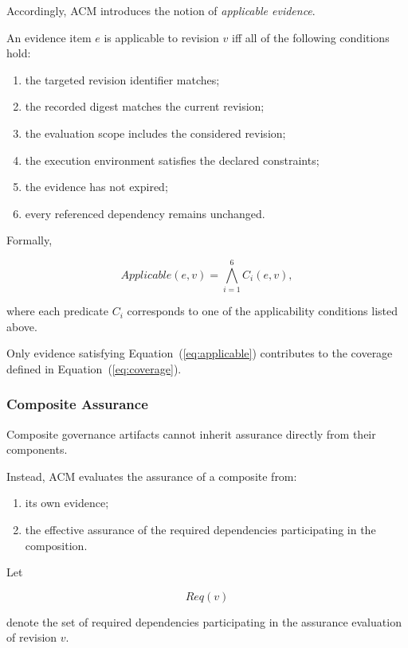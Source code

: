 \documentclass[10pt]{article}
\begin{document}
Accordingly, ACM introduces the notion of
\emph{applicable evidence}.

An evidence item
\(e\)
is applicable to revision
\(v\)
iff all of the following conditions hold:

\begin{enumerate}
    \item the targeted revision identifier matches;
    \item the recorded digest matches the current revision;
    \item the evaluation scope includes the considered revision;
    \item the execution environment satisfies the declared constraints;
    \item the evidence has not expired;
    \item every referenced dependency remains unchanged.
\end{enumerate}

Formally,

\begin{equation}
Applicable(e,v)
=
\bigwedge_{i=1}^{6}
C_i(e,v),
\label{eq:applicable}
\end{equation}

where each predicate
\(C_i\)
corresponds to one of the applicability conditions listed above.

Only evidence satisfying Equation~(\ref{eq:applicable}) contributes to the
coverage defined in Equation~(\ref{eq:coverage}).

\subsubsection{Composite Assurance}

Composite governance artifacts cannot inherit assurance directly from their
components.

Instead, ACM evaluates the assurance of a composite from:

\begin{enumerate}
    \item its own evidence;
    \item the effective assurance of the required dependencies participating in
    the composition.
\end{enumerate}

Let

\[
Req(v)
\]

denote the set of required dependencies participating in the assurance
evaluation of revision \(v\).
\end{document}
